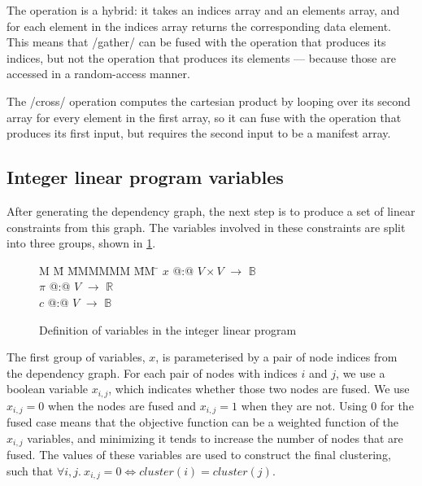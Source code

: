 The \Hs@gather@ operation is a hybrid: it takes an indices array and an elements array, and for each element in the indices array returns the corresponding data element.
This means that \Hs/gather/ can be fused with the operation that produces its indices, but not the operation that produces its elements --- because those are accessed in a random-access manner. 

The \Hs/cross/ operation computes the cartesian product by looping over its second array for every element in the first array, so it can fuse with the operation that produces its first input, but requires the second input to be a manifest array.




\subsection{Integer linear program variables}
After generating the dependency graph, the next step is to produce a set of linear constraints from this graph.
The variables involved in these constraints are split into three groups, shown in \cref{fig:clustering:ilp-vars}.

\begin{figure}
\centering
\parbox{0cm}{
\begin{tabbing}
M   \= M \= MMMMMM \= MM \= \kill
$x$   \> @:@  \> $V \times V$ \> $\to$ \> $\mathbb{B}$ \\
$\pi$ \> @:@  \> $V$             \> $\to$ \> $\mathbb{R}$ \\
$c$   \> @:@  \> $V$             \> $\to$ \> $\mathbb{B}$
\end{tabbing}
}
\caption{Definition of variables in the integer linear program}
\label{fig:clustering:ilp-vars}
\end{figure}


The first group of variables, $x$, is parameterised by a pair of node indices from the dependency graph.
For each pair of nodes with indices $i$ and $j$, we use a boolean variable $x_{i,j}$, which indicates whether those two nodes are fused.
We use $x_{i,j} = 0$ when the nodes are fused and $x_{i,j} = 1$ when they are not.
Using $0$ for the fused case means that the objective function can be a weighted function of the $x_{i,j}$ variables, and minimizing it tends to increase the number of nodes that are fused.
The values of these variables are used to construct the final clustering, such that $\forall i,j.\ x_{i,j} = 0 \iff \mathit{cluster}(i) = \mathit{cluster}(j)$.

